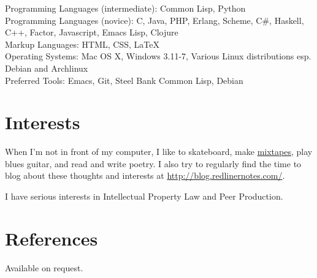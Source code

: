 \documentclass[margintitle,line]{res}
\begin{document}
\begin{resume}
Programming Languages (intermediate): Common Lisp, Python \\
Programming Languages (novice): C, Java, PHP, Erlang, Scheme, C\#, Haskell,
C++, Factor, Javascript, Emacs Lisp, Clojure \\
Markup Languages: HTML, CSS, LaTeX \\
Operating Systems: Mac OS X, Windows 3.11-7, Various Linux distributions
esp. Debian and Archlinux \\
Preferred Tools: Emacs, Git, Steel Bank Common Lisp, Debian \\


\section{Interests}

When I'm not in front of my computer, I like to skateboard, make
\href{http://soundcloud.com/redlinernotes}{mixtapes}, play blues guitar, and
read and write poetry. I also try to regularly find the time to blog about
these thoughts and interests at \url{http://blog.redlinernotes.com/}.

I have serious interests in Intellectual Property Law and Peer Production.


\section{References}

Available on request.

\end{resume}
\end{document}
